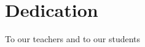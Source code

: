 \chapter*{Dedication}
\vspace{3in}
\begin{center}
 {\Huge   
    To our teachers and to our students}

\end{center}